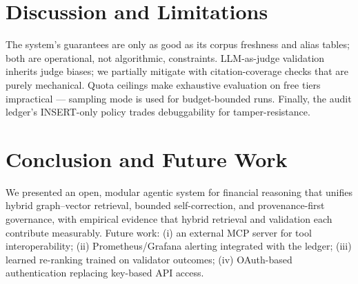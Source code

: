 \documentclass[conference]{IEEEtran}
\begin{document}
\section{Discussion and Limitations}
The system's guarantees are only as good as its corpus freshness and alias tables; both are operational, not algorithmic, constraints. LLM-as-judge validation inherits judge biases; we partially mitigate with citation-coverage checks that are purely mechanical. Quota ceilings make exhaustive evaluation on free tiers impractical --- sampling mode is used for budget-bounded runs. Finally, the audit ledger's INSERT-only policy trades debuggability for tamper-resistance.

\section{Conclusion and Future Work}
We presented an open, modular agentic system for financial reasoning that unifies hybrid graph--vector retrieval, bounded self-correction, and provenance-first governance, with empirical evidence that hybrid retrieval and validation each contribute measurably. Future work: (i) an external MCP server for tool interoperability; (ii) Prometheus/Grafana alerting integrated with the ledger; (iii) learned re-ranking trained on validator outcomes; (iv) OAuth-based authentication replacing key-based API access.



\end{document}
